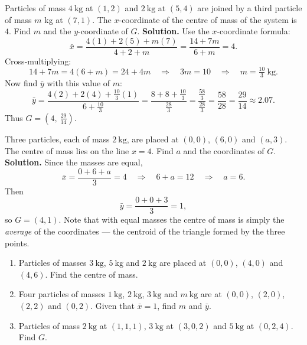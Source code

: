 \documentclass[11pt]{article}
\begin{document}
\begin{exoresolu}
Particles of mass $4\ \mathrm{kg}$ at $(1,2)$ and $2\ \mathrm{kg}$ at $(5,4)$ are joined by a third particle of mass $m$ kg at $(7,1)$. The $x$-coordinate of the centre of mass of the system is $4$. Find $m$ and the $y$-coordinate of $G$.
\tcblower
\textbf{Solution.} Use the $x$-coordinate formula:
\[
\bar{x} = \frac{4(1) + 2(5) + m(7)}{4 + 2 + m} = \frac{14 + 7m}{6 + m} = 4.
\]
Cross-multiplying:
\[
14 + 7m = 4(6 + m) = 24 + 4m \quad\Longrightarrow\quad 3m = 10 \quad\Longrightarrow\quad m = \tfrac{10}{3}\ \mathrm{kg}.
\]
Now find $\bar{y}$ with this value of $m$:
\[
\bar{y} = \frac{4(2) + 2(4) + \tfrac{10}{3}(1)}{6 + \tfrac{10}{3}} = \frac{8 + 8 + \tfrac{10}{3}}{\tfrac{28}{3}} = \frac{\tfrac{58}{3}}{\tfrac{28}{3}} = \frac{58}{28} = \frac{29}{14} \approx 2.07.
\]
Thus $G = \left(4,\ \frac{29}{14}\right)$.
\end{exoresolu}

\begin{exoresolu}
Three particles, each of mass $2\ \mathrm{kg}$, are placed at $(0,0)$, $(6,0)$ and $(a, 3)$. The centre of mass lies on the line $x = 4$. Find $a$ and the coordinates of $G$.
\tcblower
\textbf{Solution.} Since the masses are equal,
\[
\bar{x} = \frac{0 + 6 + a}{3} = 4 \quad\Longrightarrow\quad 6 + a = 12 \quad\Longrightarrow\quad a = 6.
\]
Then
\[
\bar{y} = \frac{0 + 0 + 3}{3} = 1,
\]
so $G = (4, 1)$. Note that with equal masses the centre of mass is simply the \emph{average} of the coordinates — the centroid of the triangle formed by the three points.
\end{exoresolu}

\begin{exercice}[Practice]
\begin{enumerate}
\item Particles of masses $3\ \mathrm{kg}$, $5\ \mathrm{kg}$ and $2\ \mathrm{kg}$ are placed at $(0,0)$, $(4,0)$ and $(4,6)$. Find the centre of mass.
\item Four particles of masses $1\ \mathrm{kg}$, $2\ \mathrm{kg}$, $3\ \mathrm{kg}$ and $m\ \mathrm{kg}$ are at $(0,0)$, $(2,0)$, $(2,2)$ and $(0,2)$. Given that $\bar{x} = 1$, find $m$ and $\bar{y}$.
\item Particles of mass $2\ \mathrm{kg}$ at $(1,1,1)$, $3\ \mathrm{kg}$ at $(3,0,2)$ and $5\ \mathrm{kg}$ at $(0,2,4)$. Find $G$.
\end{enumerate}
\end{exercice}
\end{document}
